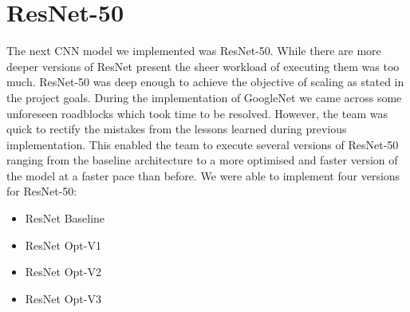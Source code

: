 \newpage
\section{ResNet-50}
The next CNN model we implemented was ResNet-50. While there are more deeper versions of ResNet present the sheer workload of executing them was too much. ResNet-50 was deep enough to achieve the objective of scaling as stated in the project goals. During the implementation of GoogleNet we came across some unforeseen roadblocks which took time to be resolved. However, the team was quick to rectify the mistakes from the lessons learned during previous implementation. This enabled the team to execute several versions of ResNet-50 ranging from the baseline architecture to a more optimised and faster version of the model at a faster pace than before.
We were able to implement four versions for ResNet-50:
\begin{itemize}
    \item ResNet Baseline
    \item ResNet Opt-V1
    \item ResNet Opt-V2
    \item ResNet Opt-V3
\end{itemize}

